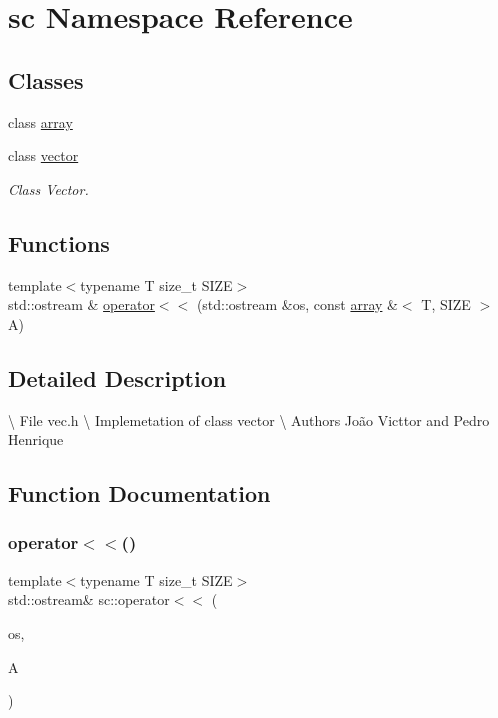 \hypertarget{namespacesc}{}\section{sc Namespace Reference}
\label{namespacesc}
\subsection*{Classes}
\begin{DoxyCompactItemize}
\item 
class \hyperlink{classsc_1_1array}{array}
\item 
class \hyperlink{classsc_1_1vector}{vector}
\begin{DoxyCompactList}\small\item\em Class Vector. \end{DoxyCompactList}\end{DoxyCompactItemize}
\subsection*{Functions}
\begin{DoxyCompactItemize}
\item 
{\footnotesize template$<$typename T size\+\_\+t S\+I\+ZE$>$ }\\std\+::ostream \& \hyperlink{namespacesc_a994d8495814ae91272d54836cc508a1f}{operator$<$$<$} (std\+::ostream \&os, const \hyperlink{classsc_1_1array}{array} \&$<$ T, S\+I\+ZE $>$ A)
\end{DoxyCompactItemize}


\subsection{Detailed Description}
\textbackslash{} File vec.\+h \textbackslash{} Implemetation of class vector \textbackslash{} Authors João Victtor and Pedro Henrique 

\subsection{Function Documentation}
\mbox{\label{namespacesc_a994d8495814ae91272d54836cc508a1f}} 
\subsubsection{\texorpdfstring{operator$<$$<$()}{operator<<()}}
{\footnotesize\ttfamily template$<$typename T size\+\_\+t S\+I\+ZE$>$ \\
std\+::ostream\& sc\+::operator$<$$<$ (\begin{DoxyParamCaption}\item[{std\+::ostream \&}]{os,  }\item[{const \hyperlink{classsc_1_1array}{array} \&$<$ T, S\+I\+ZE $>$}]{A }\end{DoxyParamCaption})}

